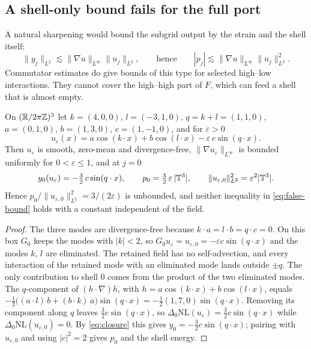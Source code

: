 \subsection{A shell-only bound fails for the full port}

A natural sharpening would bound the subgrid output by the strain and the shell itself:
\begin{equation}\label{eq:false-bound}
\|y_j\|_{L^2}\lesssim\|\nabla u\|_{L^\infty}\|u_j\|_{L^2},\qquad\text{hence}\qquad
|p_j|\lesssim\|\nabla u\|_{L^\infty}\|u_j\|_{L^2}^2 .
\end{equation}
Commutator estimates do give bounds of this type for selected high--low interactions. They cannot
cover the high--high part of $F$, which can feed a shell that is almost empty.

\begin{proposition}\label{prop:sgs-counterexample}
On $(\mathbb{R}/2\pi\mathbb{Z})^3$ let $k=(4,0,0)$, $l=(-3,1,0)$, $q=k+l=(1,1,0)$, $a=(0,1,0)$, $b=(1,3,0)$,
$c=(1,-1,0)$, and for $\varepsilon>0$
\[
u_\varepsilon(x)=a\cos(k\cdot x)+b\cos(l\cdot x)-\varepsilon\,c\sin(q\cdot x).
\]
Then $u_\varepsilon$ is smooth, zero-mean and divergence-free, $\|\nabla u_\varepsilon\|_{L^\infty}$ is
bounded uniformly for $0<\varepsilon\le1$, and at $j=0$
\[
y_0(u_\varepsilon)=-\tfrac32\,c\sin(q\cdot x),\qquad
p_0=\tfrac32\,\varepsilon\,|\mathbb{T}^3|,\qquad \|u_{\varepsilon,0}\|_{L^2}^2=\varepsilon^2|\mathbb{T}^3| .
\]
Hence $p_0/\|u_{\varepsilon,0}\|_{L^2}^2=3/(2\varepsilon)$ is unbounded, and neither inequality in
\eqref{eq:false-bound} holds with a constant independent of the field.
\end{proposition}

\begin{proof}
The three modes are divergence-free because $k\cdot a=l\cdot b=q\cdot c=0$. On this box $G_0$ keeps
the modes with $|k|<2$, so $G_0u_\varepsilon=u_{\varepsilon,0}=-\varepsilon c\sin(q\cdot x)$ and the modes $k$, $l$
are eliminated. The retained field has no self-advection, and every interaction of the retained
mode with an eliminated mode lands outside $\pm q$. The only contribution to shell $0$ comes from
the product of the two eliminated modes. The $q$-component of $(h\cdot\nabla)h$, with
$h=a\cos(k\cdot x)+b\cos(l\cdot x)$, equals $-\tfrac12\bigl((a\cdot l)\,b+(b\cdot k)\,a\bigr)\sin(q\cdot x)
=-\tfrac12(1,7,0)\sin(q\cdot x)$. Removing its component along $q$ leaves
$\tfrac32c\sin(q\cdot x)$, so $\Delta_0\mathrm{NL}(u_\varepsilon)=\tfrac32c\sin(q\cdot x)$ while
$\Delta_0\mathrm{NL}(u_{\varepsilon,0})=0$. By \eqref{eq:closure} this gives $y_0=-\tfrac32c\sin(q\cdot x)$; pairing with $u_{\varepsilon,0}$ and using $|c|^2=2$ gives $p_0$ and the shell energy.
\end{proof}

